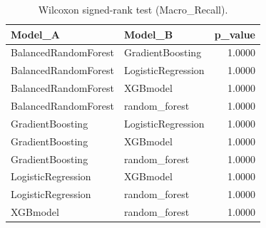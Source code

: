 \begin{table}[t]
\centering
\begin{tabular}{llr}
\toprule
Model_A & Model_B & p_value \\
\midrule
BalancedRandomForest & GradientBoosting & 1.0000 \\
BalancedRandomForest & LogisticRegression & 1.0000 \\
BalancedRandomForest & XGBmodel & 1.0000 \\
BalancedRandomForest & random_forest & 1.0000 \\
GradientBoosting & LogisticRegression & 1.0000 \\
GradientBoosting & XGBmodel & 1.0000 \\
GradientBoosting & random_forest & 1.0000 \\
LogisticRegression & XGBmodel & 1.0000 \\
LogisticRegression & random_forest & 1.0000 \\
XGBmodel & random_forest & 1.0000 \\
\bottomrule
\end{tabular}
\caption{Wilcoxon signed-rank test (Macro_Recall).}
\label{tab:wilcoxon_Macro_Recall}
\end{table}
